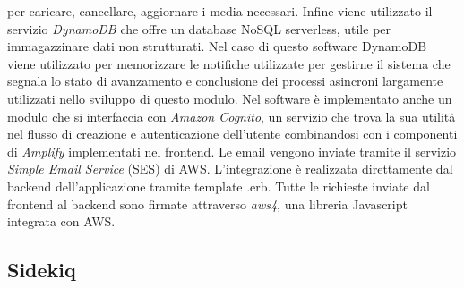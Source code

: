 \documentclass[target=bach,aauheader=,style=]{thud}
\begin{document}
per caricare, cancellare, aggiornare i media necessari. Infine viene utilizzato il servizio \textit{DynamoDB} che offre un database NoSQL serverless, utile per immagazzinare dati non strutturati.
Nel caso di questo software DynamoDB viene utilizzato per memorizzare le notifiche utilizzate per gestirne il sistema che segnala lo stato di avanzamento e conclusione dei processi asincroni
largamente utilizzati nello sviluppo di questo modulo.
Nel software è implementato anche un modulo che si interfaccia con \textit{Amazon Cognito}, un servizio che trova la sua utilità nel flusso di creazione e autenticazione dell'utente combinandosi con
i componenti di \textit{Amplify} \cite{aws_amplify_docs} implementati nel frontend.
Le email vengono inviate tramite il servizio \textit{Simple Email Service} (SES) di AWS. L'integrazione è realizzata direttamente dal backend dell'applicazione tramite template .erb.
Tutte le richieste inviate dal frontend al backend sono firmate attraverso \textit{aws4}, una libreria Javascript integrata con AWS.

\subsection{Sidekiq}
\end{document}
